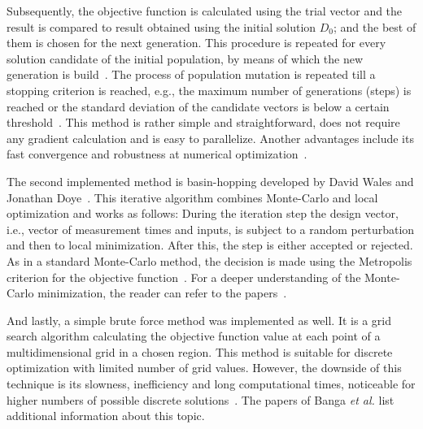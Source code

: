 \documentclass[graybox]{svmult}
\newcommand{\etal}{{\textit{et al. }}}
\begin{document}
Subsequently, the objective function is calculated using the trial vector and the result is compared to result obtained using the initial solution $D_0$; and the best of them is chosen for the next generation.
This procedure is repeated for every solution candidate of the initial population, by means of which the new generation is build~\cite{scipydiffev}.
The process of population mutation is repeated till a stopping criterion is reached, e.g., the maximum number of generations (steps) is reached or the standard deviation of the candidate vectors is below a certain threshold~\cite{Zielinski_DE}.
This method is rather simple and straightforward, does not require any gradient calculation and is easy to parallelize.
Another advantages include its fast convergence and robustness at numerical optimization~\cite{babu_differential_2007}.
\newline

The second implemented method is basin-hopping developed by David Wales and Jonathan Doye~\cite{wales_global_1997}.
This iterative algorithm combines Monte-Carlo and local optimization and works as follows:
During the iteration step the design vector, i.e., vector of measurement times and inputs, is subject to a random perturbation and then to local minimization.
After this, the step is either accepted or rejected.
As in a standard Monte-Carlo method, the decision is made using the Metropolis criterion for the objective function~\cite{scipybashop}.
For a deeper understanding of the Monte-Carlo minimization, the reader can refer to the papers~\cite{li_monte_1987, beichl_metropolis_2000}.
\newline

And lastly, a simple brute force method was implemented as well.
It is a grid search algorithm calculating the objective function value at each point of a multidimensional grid in a chosen region.
This method is suitable for discrete optimization with limited number of grid values.
However, the downside of this technique is its slowness, inefficiency and long computational times, noticeable for higher numbers of possible discrete solutions~\cite{scipybrute}.
The papers of Banga \etal \cite{banga_global_1996, banga_dynamic_2005, bangaImprovingFoodProcessing2003} list additional information about this topic.
%
\end{document}
